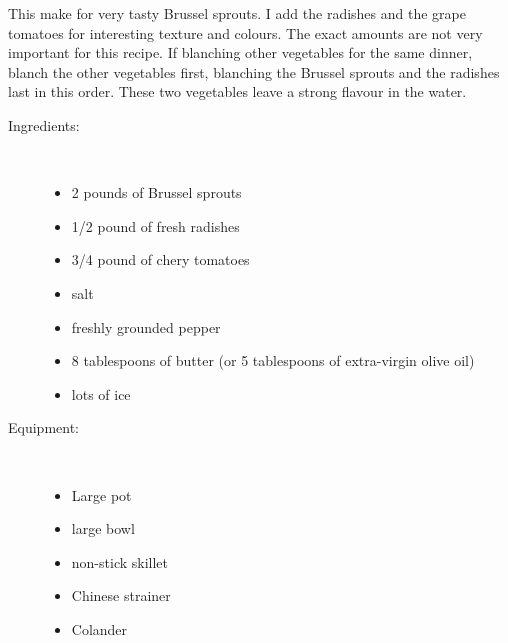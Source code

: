 \documentclass[11pt,letterpaper]{article}
\begin{document}


This make for very tasty Brussel sprouts. I add the radishes and the grape tomatoes for interesting texture and colours. The exact amounts are not very important for this recipe. If blanching other vegetables for the same dinner, blanch the other vegetables first, blanching the Brussel sprouts and the radishes last in this order. These two vegetables leave a strong flavour in the water.
\begin{description}

\item[Ingredients:]\ \\
	\begin{itemize}
	\item 2 pounds of Brussel sprouts
	\item 1/2 pound of fresh radishes 
	\item 3/4 pound of chery tomatoes
	\item salt
	\item freshly grounded pepper
	\item 8 tablespoons of butter (or 5 tablespoons of extra-virgin olive oil)
	\item lots of ice
	\end{itemize}

\item[Equipment:]\ \\
	\begin{itemize}
	\item Large pot
	\item large bowl
	\item non-stick skillet
	\item Chinese strainer
	\item Colander
	\end{itemize}


\end{description}
\end{document}
